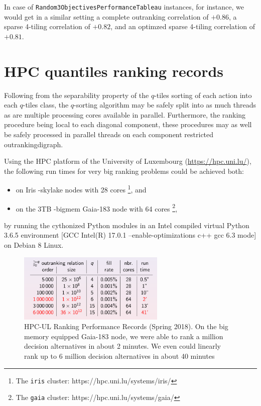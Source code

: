 In case of \texttt{Random3ObjectivesPerformanceTableau} instances, for instance, we would get in a similar setting a complete outranking correlation of $+0.86$, a sparse 4-tiling correlation of $+0.82$, and an optimzed sparse 4-tiling correlation of $+0.81$.

\section{HPC quantiles ranking records}
\label{sec:11.5}

Following from the separability property of the $q$-tiles sorting of each action into each $q$-tiles class, the $q$-sorting algorithm may be safely split into as much threads as are multiple processing cores available in parallel. Furthermore, the ranking procedure being local to each diagonal component, these procedures may as well be safely processed in parallel threads on each component restricted outrankingdigraph.

Using the HPC platform of the University of Luxembourg (\href{https://hpc.uni.lu/}{https://hpc.uni.lu/}), the following run times for very big ranking problems could be achieved both:
\begin{itemize}[topsep=1pt]
\item on Iris -skylake nodes with 28 cores \footnote{The \texttt{iris} cluster: https://hpc.uni.lu/systems/iris/}, and
\item on the 3TB -bigmem Gaia-183 node with 64 cores \footnote{The \texttt{gaia} cluster: https://hpc.uni.lu/systems/gaia/},
\end{itemize}
by running the cythonized Python modules in an Intel compiled virtual Python 3.6.5 environment [GCC Intel(R) 17.0.1 –enable-optimizations c++ gcc 6.3 mode] on Debian 8 Linux.

\begin{figure}[h]
\sidecaption
\includegraphics[width=7cm]{Figures/11-2-rankingRecords.png}
\caption{HPC-UL Ranking Performance Records (Spring 2018). On the big memory equipped Gaia-183 node, we were able to rank a million decision alternatives in about 2 minutes. We even could linearly rank up to 6 million decision alternatives in about 40 minutes}
\label{fig:11.2}       %
\end{figure}
  
\clearpage


%